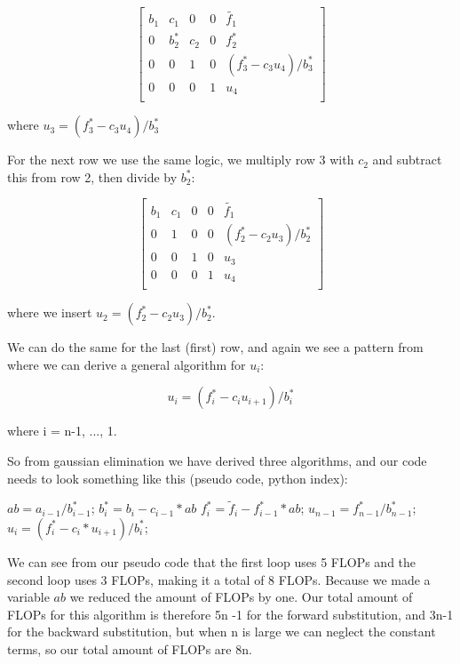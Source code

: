 \documentclass[oneside, final, 11pt, english, twocolumn]{article}
\begin{document}
\[
    \begin{bmatrix}
                           b_1& c_1 & 0 &0 & \tilde{f_1}\\
                           0 & b^*_2 & c_2 &0 & f^*_2\\
                           0&0 &1 & 0 & (f_3^* - c_3 u_4)/b_3^*\\
                           0&0 & 0 & 1 & u_4\\
                      \end{bmatrix}
\]

where $u_3 = (f_3^* - c_3 u_4)/b_3^*$

For the next row we use the same logic, we multiply row 3 with $c_2$ and subtract this from row 2, then divide by $b_2^*$:

 \[
    \begin{bmatrix}
                           b_1& c_1 & 0 &0 & \tilde{f_1}\\
                           0 & 1 & 0 &0 & (f^*_2 - c_2u_3)/b_2^*\\
                           0&0 &1 & 0 & u_3\\
                           0&0 & 0 & 1 & u_4\\
                      \end{bmatrix}
\]

where we insert $u_2 = (f_2^* - c_2 u_3)/b_2^*$. 

We can do the same for the last (first) row, and again we see a pattern from where we can derive a general algorithm for $u_i$: 

\begin{equation}
u_i =  (f_i^* - c_i u_{i+1})/b_i^*
\end{equation} 

where i = n-1, ..., 1. 

So from gaussian elimination we have derived three algorithms, and our code needs to look something like this (pseudo code, python index): 

\begin{algorithmic}[H]
\State
{}
	\State $ab = a_{i-1}/b^*_{i-1}$;
	\State $b^*_i = b_i - c_{i-1}* ab$
	\State $f^*_i = \tilde{f}_i - f^*_{i-1}* ab$;
\EndFor
\State
\State $u_{n-1} = f^*_{n-1}/b^*_{n-1}$;
\State
{}
	\State $u_i = (f^*_i - c_i*u_{i+1})/ b^*_i$;
\EndFor
\State
\end{algorithmic}


We can see from our pseudo code that the first loop uses 5 FLOPs and the second loop uses 3 FLOPs, making it a total of 8 FLOPs. Because we made a variable $ab$ we reduced the amount of FLOPs by one. Our total amount of FLOPs for this algorithm is therefore 5n -1 for the forward substitution, and 3n-1 for the backward substitution, but when n is large we can neglect the constant terms, so our total amount of FLOPs are 8n. 
\end{document}
